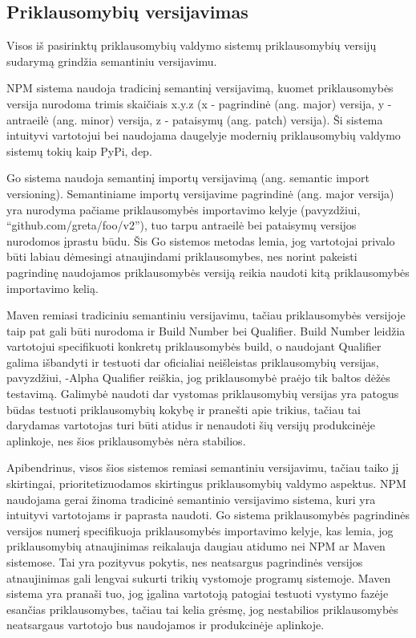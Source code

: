 \subsection{Priklausomybių versijavimas}

Visos iš pasirinktų priklausomybių valdymo sistemų priklausomybių versijų sudarymą grindžia semantiniu versijavimu.

NPM sistema naudoja tradicinį semantinį versijavimą, kuomet priklausomybės versija nurodoma trimis skaičiais x.y.z
(x - pagrindinė (ang. major) versija, y - antraeilė (ang. minor) versija, z - pataisymų (ang. patch) versija).
Ši sistema intuityvi vartotojui bei naudojama daugelyje modernių priklausomybių valdymo sistemų tokių kaip PyPi, dep.

Go sistema naudoja semantinį importų versijavimą (ang. semantic import versioning). Semantiniame importų versijavime pagrindinė
(ang. major versija) yra nurodyma pačiame priklausomybės importavimo kelyje (pavyzdžiui,
\enquote{github.com/greta/foo/v2}), tuo tarpu antraeilė bei pataisymų versijos nurodomos įprastu būdu.
Šis Go sistemos metodas lemia, jog vartotojai privalo būti labiau dėmesingi atnaujindami priklausomybes, nes
norint pakeisti pagrindinę naudojamos priklausomybės versiją reikia naudoti kitą priklausomybės importavimo kelią.

Maven remiasi tradiciniu semantiniu versijavimu, tačiau priklausomybės versijoje taip pat gali būti nurodoma ir
Build Number bei Qualifier. Build Number leidžia vartotojui specifikuoti konkretų priklausomybės build, o naudojant
Qualifier galima išbandyti ir testuoti dar oficialiai neišleistas priklausomybių versijas, pavyzdžiui, -Alpha Qualifier
reiškia, jog priklausomybė praėjo tik baltos dėžės testavimą. Galimybė naudoti dar vystomas priklausomybių versijas yra patogus
būdas testuoti priklausomybių kokybę ir pranešti apie trikius, tačiau tai darydamas vartotojas turi būti atidus ir
nenaudoti šių versijų produkcinėje aplinkoje, nes šios priklausomybės nėra stabilios.

Apibendrinus, visos šios sistemos remiasi semantiniu versijavimu, tačiau taiko jį skirtingai, prioritetizuodamos skirtingus priklausomybių
valdymo aspektus. NPM naudojama gerai žinoma tradicinė semantinio versijavimo sistema, kuri yra intuityvi vartotojams ir paprasta
naudoti. Go sistema priklausomybės pagrindinės versijos numerį specifikuoja priklausomybės importavimo kelyje, kas lemia, jog priklausomybių
atnaujinimas reikalauja daugiau atidumo nei NPM ar Maven sistemose. Tai yra pozityvus pokytis, nes neatsargus pagrindinės versijos atnaujinimas
gali lengvai sukurti trikių vystomoje programų sistemoje. Maven sistema yra pranaši tuo, jog įgalina vartotoją patogiai testuoti
vystymo fazėje esančias priklausomybes, tačiau tai kelia grėsmę, jog nestabilios priklausomybės neatsargaus vartotojo
bus naudojamos ir produkcinėje aplinkoje.
